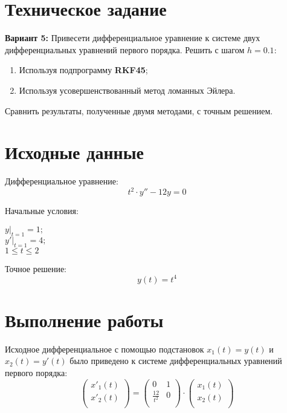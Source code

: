 





\section{Техническое задание}

\textbf{Вариант 5:} Привесети дифференциальное уравнение к системе двух дифференциальных уравнений первого порядка. Решить с шагом $h = 0.1$:
\begin{enumerate}
\item Используя подпрограмму \textbf{RKF45};
\item Используя усовершенствованный метод ломанных Эйлера.
\end{enumerate}
Сравнить результаты, полученные двумя методами, с точным решением. 

\section{Исходные данные}

Дифференциальное уравнение:
\[
t^2\cdot y'' - 12y = 0
\]

Начальные условия:
\begin{center}
\begin{multicols}{3} 
	$\left. y \right|_{t=1} = 1;$ \\
	$\left. y' \right|_{t=1} = 4;$ \\
	$1 \le t \le 2$
\end{multicols}
\end{center}

Точное решение:
\[
y(t) = t^4
\]

\section{Выполнение работы}

Исходное дифференциальное с помощью подстановок $x_1(t) = y(t)$ и $x_2(t) = y'(t)$ было приведено к системе дифференциальных уравнений первого порядка:
\[
\begin{pmatrix}
    x'_1(t) \\
    x'_2(t) \\
\end{pmatrix}
  =
\begin{pmatrix}
    0 & 1 \\
    \frac{12}{t^2} & 0 \\
\end{pmatrix}
\cdot
\begin{pmatrix}
    x_1(t) \\
    x_2(t) \\
\end{pmatrix}
\]

